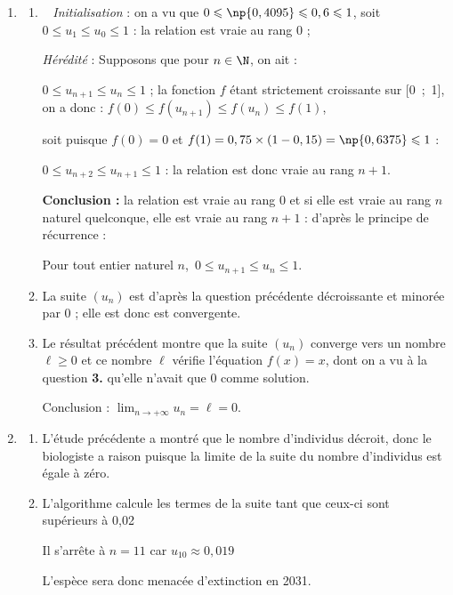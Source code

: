 \begin{enumerate}[resume]
\item 
	\begin{enumerate}
		\item ~
\emph{Initialisation} : on a vu que $0 \leqslant \np{0,4095} \leqslant 0,6 \leqslant 1$, soit $0 \leqslant u_1 \leqslant u_0\leqslant 1$ : la relation est vraie au rang $0$ ;

\emph{Hérédité} : Supposons que pour $n \in \N$, on ait :

$0 \leqslant u_{n+1} \leqslant  u_n \leqslant 1$ ; la fonction $f$ étant strictement croissante sur [0~;~1], on a donc :
$f(0) \leqslant f\left(u_{n+1}\right) \leqslant f\left(u_n\right) \leqslant f(1)$, 

soit puisque $f(0) = 0$ et $f(1) = 0,75 \times (1 - 0,15) = \np{0,6375} \leqslant 1$ :

$0 \leqslant u_{n+2} \leqslant u_{n+1} \leqslant  1$ : la relation est donc vraie au rang $n + 1$.

\textbf{Conclusion :} la relation est vraie au rang 0 et si elle est vraie au rang $n$ naturel quelconque, elle est vraie au rang $n+1$ : d'après le principe de récurrence :

Pour tout entier naturel $n$,\, $0 \leqslant u_{n+1} \leqslant  u_n \leqslant 1$.	
		
		\item 
La suite $\left(u_n\right)$ est d'après la question précédente décroissante et minorée par $0$ ; elle est donc est convergente.
		\item 
Le résultat précédent montre que la suite $\left(u_n\right)$ converge vers un nombre $\ell \geqslant 0$ et ce nombre $\ell$ vérifie l'équation $f(x) = x$, dont on a vu à la question \textbf{3.} qu'elle n'avait que $0$ comme solution.
		
Conclusion : $\displaystyle\lim_{n \to + \infty} u_n = \ell = 0$.
	\end{enumerate}
\item 
	\begin{enumerate}
		\item 
L'étude précédente a montré que le nombre d'individus décroit, donc le biologiste a raison puisque la limite de la suite du nombre d'individus est égale à zéro.
		\item 
















L'algorithme calcule les termes de la suite tant que ceux-ci sont supérieurs à 0,02

Il s'arrête à $n = 11$ car $u_{10} \approx 0,019$

L'espèce sera donc menacée d'extinction en 2031.

	\end{enumerate}
\end{enumerate}
